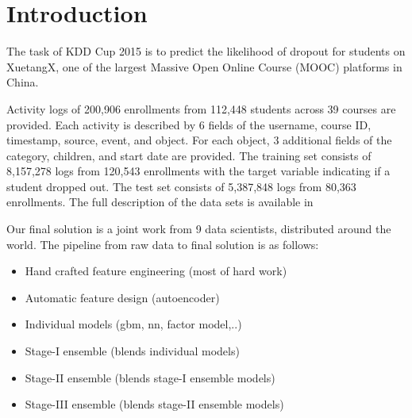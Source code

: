 \section{Introduction}
The task of KDD Cup 2015 is to predict the likelihood of dropout for students on XuetangX, one of the largest Massive Open Online Course (MOOC) platforms in China.

Activity logs of 200,906 enrollments from 112,448 students across 39 courses are provided.
Each activity is described by 6 fields of the username, course ID, timestamp, source, event, and object. 
For each object, 3 additional fields of the category, children, and start date are provided.
The training set consists of 8,157,278 logs from 120,543 enrollments with the target variable indicating if a student dropped out.  
The test set consists of 5,387,848 logs from 80,363 enrollments.
The full description of the data sets is available in \cite{kddcup2015_data}



Our final solution is a joint work from 9 data scientists, distributed around the world.
The pipeline from raw data to final solution is as follows:
\begin{itemize}
  \setlength\itemsep{0em}
  \item Hand crafted feature engineering (most of hard work)
  \item Automatic feature design (autoencoder)
  \item Individual models (gbm, nn, factor model,..)
  \item Stage-I ensemble (blends individual models)
  \item Stage-II ensemble (blends stage-I ensemble models)
  \item Stage-III ensemble (blends stage-II ensemble models)
\end{itemize}

